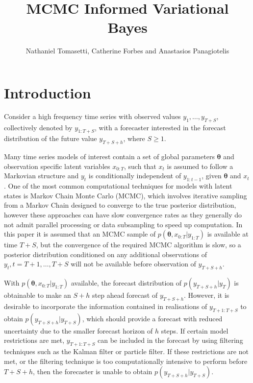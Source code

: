 \documentclass[12pt,a4paper]{article}%
\title{MCMC Informed Variational Bayes}
\author{Nathaniel Tomasetti, Catherine Forbes and Anastasios Panagiotelis}
\date{}
\numberwithin{equation}{section}
\begin{document}
\maketitle

\tableofcontents

\section{Introduction}
\label{Intro}

Consider a high frequency time series with observed values $y_{1}, \dots, y_{T+S}$, collectively denoted by $y_{1:T+S}$, with a forecaster interested in the forecast distribution of the future value $y_{T+S+h}$, where $S \geq 1$.  

Many time series models of interest contain a set of global parameters $\boldsymbol{\theta}$ and observation specific latent variables $x_{0:T}$, such that $x_t$ is assumed to follow a Markovian structure and $y_t$ is conditionally independent of $y_{1:t-1}$, given $\boldsymbol{\theta}$ and $x_t$. One of the most common computational techniques for models with latent states is Markov Chain Monte Carlo (MCMC), which involves iterative sampling from a Markov Chain designed to converge to the true posterior distribution, however these approaches can have slow convergence rates as they generally do not admit parallel processing or data subsampling to speed up computation. In this paper it is assumed that an MCMC sample of $p(\boldsymbol{\theta}, x_{0:T} | y_{1:T})$ is available at time $T+S$, but the convergence of the required MCMC algorithm is slow, so a posterior distribution conditioned on any additional observations of $y_t, t = T+1, \dots, T+S$ will not be available before observation of $y_{T+S+h}$. 

With $p(\boldsymbol{\theta}, x_{0:T}| y_{1:T})$ available, the forecast distribution of $p(y_{T+S+h} | y_{T})$ is obtainable to make an $S+h$ step ahead forecast of $y_{T+S+h}$. However, it is desirable to incorporate the information contained in realisations of $y_{T+1:T+S}$ to obtain $p(y_{T+S+h} | y_{T+S})$, which should provide a forecast with reduced uncertainty due to the smaller forecast horizon of $h$ steps. If certain model restrictions are met, $y_{T+1:T+S}$ can be included in the forecast by using filtering techniques such as the Kalman filter or particle filter. If these restrictions are not met, or the filtering technique is too computationally intensive to perform before $T+S+h$, then the forecaster is unable to obtain $p(y_{T+S+h} | y_{T+S})$. 
\end{document}
